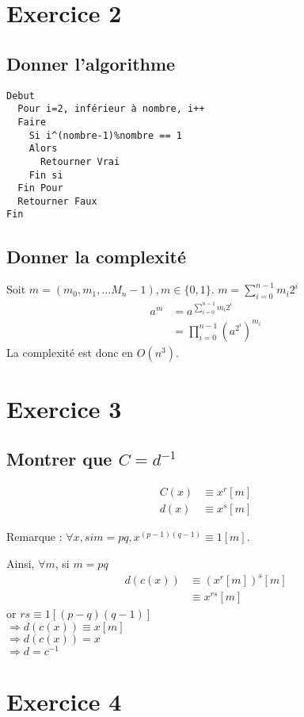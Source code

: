 \section{Exercice 2}
\subsection{Donner l'algorithme}
\begin{verbatim}
Debut
  Pour i=2, inférieur à nombre, i++
  Faire
    Si i^(nombre-1)%nombre == 1
    Alors
      Retourner Vrai
    Fin si
  Fin Pour
  Retourner Faux
Fin
\end{verbatim}

\subsection{Donner la complexité}
Soit $m = (m_0, m_1, ... M_n-1), m \in \{0,1\}$.
$m = \displaystyle{\sum^{n-1}_{i=0}}m_i2^i$
\begin{align*}
a^m &= a^{\displaystyle{\sum^{n-1}_{i=0}}m_i2^i}\\
&= \displaystyle{\prod^{n-1}_{i=0}}(a^{2^i})^{m_i}
\end{align*}
La complexité est donc en $O(n^3)$.

\section{Exercice 3}
\subsection{Montrer que $C=d^{-1}$}
\begin{align*}
C(x) &\equiv x^r[m]\\
d(x) &\equiv x^s[m]
\end{align*}

Remarque : $\forall x, si m = pq, x^{(p-1)(q-1)} \equiv 1[m]$.

Ainsi, $\forall m$, si $m = pq$
\begin{align*}
d(c(x)) &\equiv (x^r[m])^s[m]\\
&\equiv x^{rs}[m]
\end{align*}
or $rs \equiv 1[(p-q)(q-1)]$\\
$\Rightarrow d(c(x)) \equiv x[m]$\\
$\Rightarrow d(c(x)) = x$\\
$\Rightarrow d = c^{-1}$\\

\section{Exercice 4}
